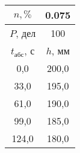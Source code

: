 \begin{tabular}[t]{|c|c|}
\hline
$n, \%$ & 0.075 \\
\hline
$P$, дел & 100 \\
\hline
$t_{абс}$, с & $h$, мм \\ 
\hline
0,0 & 200,0 \\ 
33,0 & 195,0 \\ 
61,0 & 190,0 \\ 
99,0 & 185,0 \\ 
124,0 & 180,0 \\ 
\hline
\end{tabular}